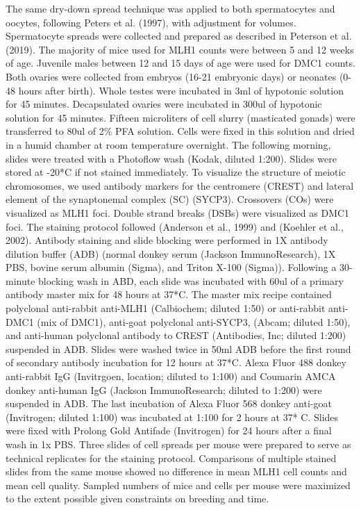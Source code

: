 \documentclass[
]{article}
\begin{document}
The same dry-down spread technique was applied to both spermatocytes and
oocytes, following Peters et al. (1997), with adjustment for volumes.
Spermatocyte spreads were collected and prepared as described in
Peterson et al. (2019). The majority of mice used for MLH1 counts were
between 5 and 12 weeks of age. Juvenile males between 12 and 15 days of
age were used for DMC1 counts. Both ovaries were collected from embryos
(16-21 embryonic days) or neonates (0-48 hours after birth). Whole
testes were incubated in 3ml of hypotonic solution for 45 minutes.
Decapsulated ovaries were incubated in 300ul of hypotonic solution for
45 minutes. Fifteen microliters of cell slurry (masticated gonads) were
transferred to 80ul of 2\% PFA solution. Cells were fixed in this
solution and dried in a humid chamber at room temperature overnight. The
following morning, slides were treated with a Photoflow wash (Kodak,
diluted 1:200). Slides were stored at -20*C if not stained immediately.
To visualize the structure of meiotic chromosomes, we used antibody
markers for the centromere (CREST) and lateral element of the
synaptonemal complex (SC) (SYCP3). Crossovers (COs) were visualized as
MLH1 foci. Double strand breaks (DSBs) were visualized as DMC1 foci. The
staining protocol followed (Anderson et al., 1999) and (Koehler et al.,
2002). Antibody staining and slide blocking were performed in 1X
antibody dilution buffer (ADB) (normal donkey serum (Jackson
ImmunoResearch), 1X PBS, bovine serum albumin (Sigma), and Triton X-100
(Sigma)). Following a 30-minute blocking wash in ABD, each slide was
incubated with 60ul of a primary antibody master mix for 48 hours at
37*C. The master mix recipe contained polyclonal anti-rabbit anti-MLH1
(Calbiochem; diluted 1:50) or anti-rabbit anti-DMC1 (mix of DMC1),
anti-goat polyclonal anti-SYCP3, (Abcam; diluted 1:50), and anti-human
polyclonal antibody to CREST (Antibodies, Inc; diluted 1:200) suspended
in ADB. Slides were washed twice in 50ml ADB before the first round of
secondary antibody incubation for 12 hours at 37*C. Alexa Fluor 488
donkey anti-rabbit IgG (Invitrgoen, location; diluted to 1:100) and
Coumarin AMCA donkey anti-human IgG (Jackson ImmunoResearch; diluted to
1:200) were suspended in ADB. The last incubation of Alexa Fluor 568
donkey anti-goat (Invitrogen; diluted 1:100) was incubated at 1:100 for
2 hours at 37* C. Slides were fixed with Prolong Gold Antifade
(Invitrogen) for 24 hours after a final wash in 1x PBS. Three slides of
cell spreads per mouse were prepared to serve as technical replicates
for the staining protocol. Comparisons of multiple stained slides from
the same mouse showed no difference in mean MLH1 cell counts and mean
cell quality. Sampled numbers of mice and cells per mouse were maximized
to the extent possible given constraints on breeding and time.
\end{document}
